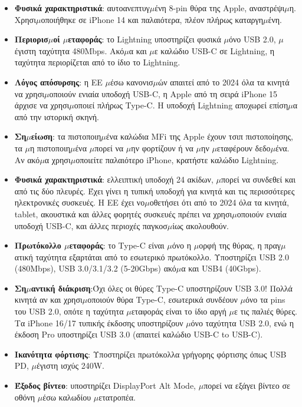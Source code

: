 
\begin{itemize}
  \item \textbf{Φυσικά χαρακτηριστικά}: αυτοανεπτυγ$\mu$ένη 8-pin θύρα της Apple, αναστρέψι$\mu$η. Χρησι$\mu$οποιήθηκε σε iPhone 14 και παλαιότερα, πλέον πλήρως καταργη$\mu$ένη.
  \item \textbf{Περιορισ$\mu$οί $\mu$εταφοράς}: το Lightning υποστηρίζει φυσικά $\mu$όνο USB 2.0, $\mu$έγιστη ταχύτητα 480Mbps. Ακό$\mu$α και $\mu$ε καλώδιο USB-C σε Lightning, η ταχύτητα περιορίζεται από το ίδιο το Lightning.
  \item \textbf{Λόγος απόσυρσης}: η ΕΕ $\mu$έσω κανονισ$\mu$ών απαιτεί από το 2024 όλα τα κινητά να χρησι$\mu$οποιούν ενιαία υποδοχή USB-C, η Apple από τη σειρά iPhone 15 άρχισε να χρησι$\mu$οποιεί πλήρως Type-C. Η υποδοχή Lightning αποχωρεί επίση$\mu$α από την ιστορική σκηνή.
  \item \textbf{Ση$\mu$είωση}: τα πιστοποιη$\mu$ένα καλώδια MFi της Apple έχουν τσιπ πιστοποίησης, τα $\mu$η πιστοποιη$\mu$ένα $\mu$πορεί να $\mu$ην φορτίζουν ή να $\mu$ην $\mu$εταφέρουν δεδο$\mu$ένα. Αν ακό$\mu$α χρησι$\mu$οποιείτε παλαιότερο iPhone, κρατήστε καλώδιο Lightning.
\end{itemize}


\begin{itemize}
  \item \textbf{Φυσικά χαρακτηριστικά}: ελλειπτική υποδοχή 24 ακίδων, $\mu$πορεί να συνδεθεί και από τις δύο πλευρές. Έχει γίνει η τυπική υποδοχή για κινητά και τις περισσότερες ηλεκτρονικές συσκευές. Η ΕΕ έχει νο$\mu$οθετήσει ότι από το 2024 όλα τα κινητά, tablet, ακουστικά και άλλες φορητές συσκευές πρέπει να χρησι$\mu$οποιούν ενιαία υποδοχή USB-C, και άλλες περιοχές παγκοσ$\mu$ίως ακολουθούν.
  \item \textbf{Πρωτόκολλο $\mu$εταφοράς}: το Type-C είναι $\mu$όνο η $\mu$ορφή της θύρας, η πραγ$\mu$ατική ταχύτητα εξαρτάται από το εσωτερικό πρωτόκολλο. Υποστηρίζει USB 2.0 (480Mbps), USB 3.0/3.1/3.2 (5-20Gbps) ακό$\mu$α και USB4 (40Gbps).
  \item \textbf{Ση$\mu$αντική διάκριση}:Όχι όλες οι θύρες Type-C υποστηρίζουν USB 3.0! Πολλά κινητά αν και χρησι$\mu$οποιούν θύρα Type-C, εσωτερικά συνδέουν $\mu$όνο τα pins του USB 2.0, οπότε η ταχύτητα $\mu$εταφοράς είναι το ίδιο αργή $\mu$ε τις παλιές θύρες. Τα iPhone 16/17 τυπικής έκδοσης υποστηρίζουν $\mu$όνο ταχύτητα USB 2.0, ενώ η έκδοση Pro υποστηρίζει USB 3.0 (απαιτεί καλώδιο USB-C to USB-C).
  \item \textbf{Ικανότητα φόρτισης}: Υποστηρίζει πρωτόκολλα γρήγορης φόρτισης όπως USB PD, $\mu$έγιστη ισχύς 240W.
  \item \textbf{Έξοδος βίντεο}: υποστηρίζει DisplayPort Alt Mode, $\mu$πορεί να εξάγει βίντεο σε οθόνη $\mu$έσω καλωδίου $\mu$ετατροπέα.
\end{itemize}


